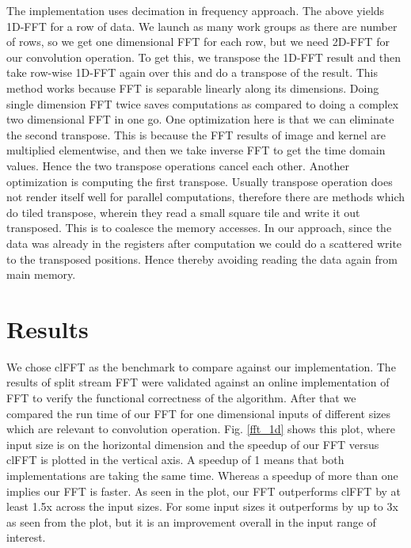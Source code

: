 \documentclass[sigconf]{acmart}
\begin{document}
The implementation uses decimation in frequency approach. The above yields 1D-FFT for a row of data. We launch as many work groups as there are number of rows, so we get one dimensional FFT for each row, but we need 2D-FFT for our convolution operation. To get this, we transpose the 1D-FFT result and then take row-wise 1D-FFT again over this and do a transpose of the result. This method works because FFT is separable linearly along its dimensions. Doing single dimension FFT twice saves computations as compared to doing a complex two dimensional FFT in one go. One optimization here is that we can eliminate the second transpose. This is because the FFT results of image and kernel are multiplied elementwise, and then we take inverse FFT to get the time domain values. Hence the two transpose operations cancel each other. Another optimization is computing the first transpose. Usually transpose operation does not render itself well for parallel computations, therefore there are methods which do tiled transpose, wherein they read a small square tile and write it out transposed. This is to coalesce the memory accesses. In our approach, since the data was already in the registers after computation we could do a scattered write to the transposed positions. Hence thereby avoiding reading the data again from main memory.

\section{Results}
We chose clFFT as the benchmark to compare against our implementation. The results of split stream FFT were validated against an online implementation of FFT to verify the functional correctness of the algorithm. After that we compared the run time of our FFT for one dimensional inputs of different sizes which are relevant to convolution operation. Fig. \ref{fft_1d} shows this plot, where input size is on the horizontal dimension and the speedup of our FFT versus clFFT is plotted in the vertical axis. A speedup of 1 means that both implementations are taking the same time. Whereas a speedup of more than one implies our FFT is faster. As seen in the plot, our FFT outperforms clFFT by at least 1.5x across the input sizes. For some input sizes it outperforms by up to 3x as seen from the plot, but it is an improvement overall in the input range of interest.
\end{document}
